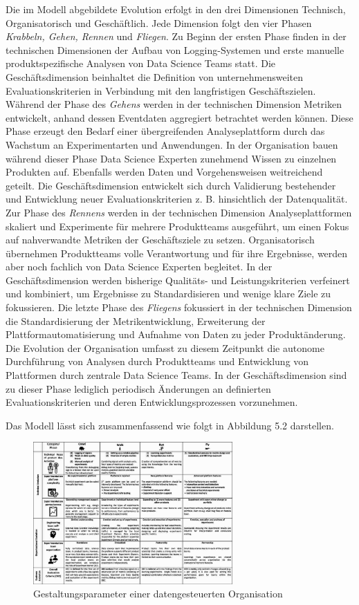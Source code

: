 Die im Modell abgebildete Evolution erfolgt in den drei Dimensionen Technisch, Organisatorisch und Geschäftlich. 
Jede Dimension folgt den vier Phasen \textit{Krabbeln, Gehen, Rennen} und \textit{Fliegen}.
Zu Beginn der ersten Phase finden in der technischen Dimensionen der Aufbau von Logging-Systemen und erste manuelle produktspezifische Analysen von Data Science Teams statt.
Die Geschäftsdimension beinhaltet die Definition von unternehmensweiten Evaluationskriterien in Verbindung mit den langfristigen Geschäftszielen.
Während der Phase des \textit{Gehens} werden in der technischen Dimension Metriken entwickelt, anhand dessen Eventdaten aggregiert betrachtet werden können.
Diese Phase erzeugt den Bedarf einer übergreifenden Analyseplattform durch das Wachstum an Experimentarten und Anwendungen. 
In der Organisation bauen während dieser Phase Data Science Experten zunehmend Wissen zu einzelnen Produkten auf.
Ebenfalls werden Daten und Vorgehensweisen weitreichend geteilt.
Die Geschäftsdimension entwickelt sich durch Validierung bestehender und Entwicklung neuer Evaluationskriterien z. B. hinsichtlich der Datenqualität.
Zur Phase des \textit{Rennens} werden in der technischen Dimension Analyseplattformen skaliert und Experimente für mehrere Produktteams ausgeführt, um einen Fokus auf nahverwandte Metriken der Geschäftsziele zu setzen.
Organisatorisch übernehmen Produktteams volle Verantwortung und für ihre Ergebnisse, werden aber noch fachlich von Data Science Experten begleitet.
In der Geschäftsdimension werden bisherige Qualitäts- und Leistungskriterien verfeinert und kombiniert, um Ergebnisse zu Standardisieren und wenige klare Ziele zu fokussieren.
Die letzte Phase des \textit{Fliegens} fokussiert in der technischen Dimension die Standardisierung der Metrikentwicklung, Erweiterung der Plattformautomatisierung und Aufnahme von Daten zu jeder Produktänderung.
Die Evolution der Organisation umfasst zu diesem Zeitpunkt die autonome Durchführung von Analysen durch Produktteams und Entwicklung von Plattformen durch zentrale Data Science Teams.
In der Geschäftsdimension sind zu dieser Phase lediglich periodisch Änderungen an definierten Evaluationskriterien und deren Entwicklungsprozessen vorzunehmen.

Das Modell lässt sich zusammenfassend wie folgt in Abbildung 5.2 darstellen.
\begin{figure}[htb]
    \centering
    \includegraphics[width=0.68\textwidth]{graphics/EEM model.png}
    \caption{Gestaltungsparameter einer datengesteuerten Organisation}
    \label{fig:EEM model}
\end{figure}